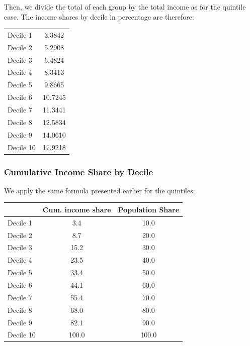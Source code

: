 \documentclass[letterpaper]{article}\usepackage[]{graphicx}\usepackage[]{color}
\numberwithin{exer}{section}
\theoremstyle{nonumberplain}
\begin{document}
Then, we divide the total of each group by the total income as for
the quintile case. The income shares by decile in percentage are
therefore:
\begin{center}
\begin{tabular}{lc}
  \hline
  \hline
Decile 1 & 3.3842 \\ 
  Decile 2 & 5.2908 \\ 
  Decile 3 & 6.4824 \\ 
  Decile 4 & 8.3413 \\ 
  Decile 5 & 9.8665 \\ 
  Decile 6 & 10.7245 \\ 
  Decile 7 & 11.3441 \\ 
  Decile 8 & 12.5834 \\ 
  Decile 9 & 14.0610 \\ 
  Decile 10 & 17.9218 \\ 
   \hline
\end{tabular}

\end{center}

\subsubsection*{Cumulative Income Share by Decile}

We apply the same formula presented earlier for the quintiles:

\begin{center}
\begin{tabular}{lcc}
  \hline
 & Cum. income share & Population Share \\ 
  \hline
Decile 1 & 3.4 & 10.0 \\ 
  Decile 2 & 8.7 & 20.0 \\ 
  Decile 3 & 15.2 & 30.0 \\ 
  Decile 4 & 23.5 & 40.0 \\ 
  Decile 5 & 33.4 & 50.0 \\ 
  Decile 6 & 44.1 & 60.0 \\ 
  Decile 7 & 55.4 & 70.0 \\ 
  Decile 8 & 68.0 & 80.0 \\ 
  Decile 9 & 82.1 & 90.0 \\ 
  Decile 10 & 100.0 & 100.0 \\ 
   \hline
\end{tabular}

\end{center}
\end{document}
